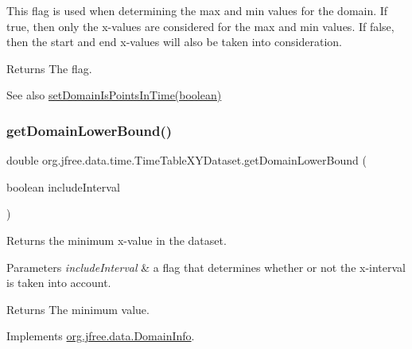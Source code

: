 This flag is used when determining the max and min values for the domain. If true, then only the x-\/values are considered for the max and min values. If false, then the start and end x-\/values will also be taken into consideration.

\begin{DoxyReturn}{Returns}
The flag.
\end{DoxyReturn}
\begin{DoxySeeAlso}{See also}
\mbox{\hyperlink{classorg_1_1jfree_1_1data_1_1time_1_1_time_table_x_y_dataset_a3dfd1e08223b07236245bed2739011ac}{set\+Domain\+Is\+Points\+In\+Time(boolean)}} 
\end{DoxySeeAlso}
\mbox{\label{classorg_1_1jfree_1_1data_1_1time_1_1_time_table_x_y_dataset_a81f1ebe8487533e070d335efa8974bf8}} 
\subsubsection{\texorpdfstring{get\+Domain\+Lower\+Bound()}{getDomainLowerBound()}}
{\footnotesize\ttfamily double org.\+jfree.\+data.\+time.\+Time\+Table\+X\+Y\+Dataset.\+get\+Domain\+Lower\+Bound (\begin{DoxyParamCaption}\item[{boolean}]{include\+Interval }\end{DoxyParamCaption})}

Returns the minimum x-\/value in the dataset.


\begin{DoxyParams}{Parameters}
{\em include\+Interval} & a flag that determines whether or not the x-\/interval is taken into account.\\
\hline
\end{DoxyParams}
\begin{DoxyReturn}{Returns}
The minimum value. 
\end{DoxyReturn}


Implements \mbox{\hyperlink{interfaceorg_1_1jfree_1_1data_1_1_domain_info_ae1b4d9d415fe0a79bd2ce0f6e0a3f489}{org.\+jfree.\+data.\+Domain\+Info}}.

